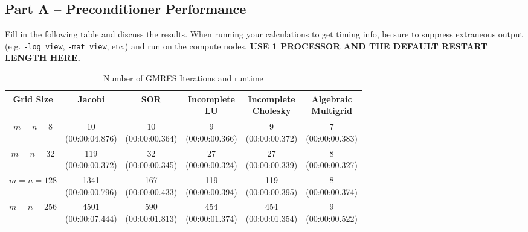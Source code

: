 \documentclass[letterpaper]{article}
\begin{document}
\subsection*{Part A -- Preconditioner Performance}
Fill in the following table and discuss the results.
When running your calculations to get timing info, be sure to suppress extraneous output (e.g. \lstinline{-log_view}, \lstinline{-mat_view}, etc.) and run on the compute nodes.
\textbf{USE 1 PROCESSOR AND THE DEFAULT RESTART LENGTH HERE.}

\begin{table}[h!]
    \centering
    \caption{Number of GMRES Iterations and runtime}
    \begin{tabular}{|c|c|c|c|c|c|}
    \hline
     Grid Size & Jacobi & SOR & \thead{Incomplete\\ LU} & \thead{Incomplete\\ Cholesky} & \thead{Algebraic\\ Multigrid} \\\hline
     $m=n=8$    & \thead{10\\(00:00:04.876)}                     & \thead{10\\(00:00:00.364)}   & \thead{9\\(00:00:00.366)}    & \thead{9\\(00:00:00.372)}    & \thead{7\\(00:00:00.383)}  \\\hline
     $m=n=32$   & \thead{119\\(00:00:00.372)}                    & \thead{32\\(00:00:00.345)}   & \thead{27\\(00:00:00.324)}   & \thead{27\\(00:00:00.339)}   & \thead{8\\(00:00:00.327)}  \\\hline
     $m=n=128$  & \thead{1341\\(00:00:00.796)}                   & \thead{167\\(00:00:00.433)}  & \thead{119\\(00:00:00.394)}  & \thead{119\\(00:00:00.395)}  & \thead{8\\(00:00:00.374)}  \\\hline
     $m=n=256$  & \thead{4501\\(00:00:07.444)}                   & \thead{590\\(00:00:01.813)}  & \thead{454\\(00:00:01.374)}  & \thead{454\\(00:00:01.354)}  & \thead{9\\(00:00:00.522)}  \\\hline

\end{tabular}
\end{table}
\end{document}
